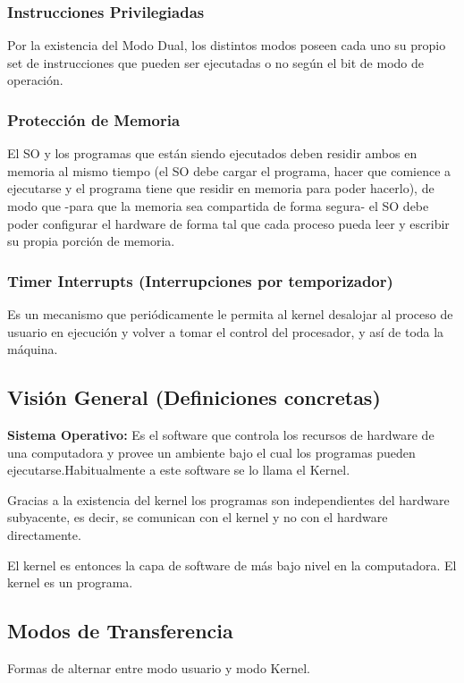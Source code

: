 \documentclass[../main.tex]{subfiles}
\begin{document}
        \subsubsection*{Instrucciones Privilegiadas}
            Por la existencia del Modo Dual, los distintos modos poseen cada uno su propio set de instrucciones que pueden ser ejecutadas o no según el bit de modo de operación.
            
        \subsubsection*{Protección de Memoria}
            El SO y los programas que están siendo ejecutados deben residir ambos en memoria al mismo tiempo (el SO debe cargar el programa, hacer que comience a ejecutarse y el programa tiene que residir en memoria para poder hacerlo), de modo que -para que la memoria sea compartida de forma segura- el SO debe poder configurar el hardware de forma tal que cada proceso pueda leer y escribir su propia porción de memoria.
        
        \subsubsection*{Timer Interrupts (Interrupciones por temporizador)}
            Es un mecanismo que periódicamente le permita al kernel desalojar al proceso de usuario en ejecución y volver a tomar el control del procesador, y así de toda la máquina.

    \subsection*{Visión General (Definiciones concretas)}
        \textbf{Sistema Operativo:}  Es el software que controla los recursos de hardware de una computadora y provee un ambiente bajo el cual los programas pueden ejecutarse.Habitualmente a este software se lo llama el Kernel.

        Gracias a la existencia del kernel los programas son independientes del hardware subyacente, es decir, se comunican con el kernel y no con el hardware directamente.  

        El kernel es entonces la capa de software de más bajo nivel en la computadora. El kernel es un programa.

    \subsection*{Modos de Transferencia}
        Formas de alternar entre modo usuario y modo Kernel.
        
\end{document}

